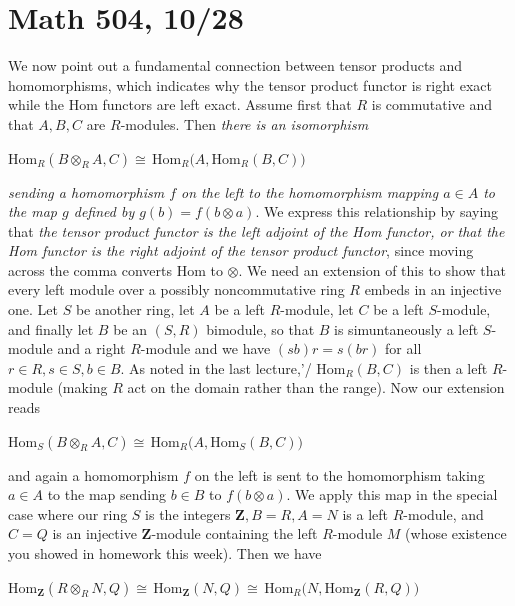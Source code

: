 \documentclass[10pt]{article}
\begin{document}
\section*{Math 504, 10/28}

We now point out a fundamental connection between tensor products and
homomorphisms, which indicates why the tensor product functor is right
exact while the Hom functors are left exact. Assume first that $R$ is
commutative and that $A,B,C$ are $R$-modules. Then {\sl there is an
  isomorphism}

Hom$_R(B\otimes_R A,C)\cong\,$Hom$_R(A,$Hom$_R(B,C))$

{\sl sending a homomorphism $f$ on the left to the homomorphism mapping
  $a\in A$ to the map $g$ defined by $g(b) = f(b\otimes a)$}. We express
this relationship by saying that {\sl the tensor product functor is the
  left adjoint of the Hom functor, or that the Hom functor is the right
  adjoint of the tensor product functor}, since moving across the comma
converts Hom to $\otimes$. We need an extension of this to show that
every left module over a possibly noncommutative ring $R$ embeds in an
injective one. Let $S$ be another ring, let $A$ be a left $R$-module,
let $C$ be a left $S$-module, and finally let $B$ be an $(S,R)$
bimodule, so that $B$ is simuntaneously a left $S$-module and a right
$R$-module and we have $(sb)r = s(br)$ for all $r\in R,s\in S,b\in B$.
As noted in the last lecture,'/ Hom$_R(B,C)$ is then a left $R$-module
(making $R$ act on the domain rather than the range). Now our extension
reads

Hom$_S(B\otimes_R A,C)\cong\,$Hom$_R(A,$Hom$_S(B,C))$

and again a homomorphism $f$ on the left is sent to the homomorphism
taking $a\in A$ to the map sending $b\in B$ to $f(b\otimes a)$. We apply
this map in the special case where our ring $S$ is the integers $\mathbf
Z, B=R, A=N$ is a left $R$-module, and $C=Q$ is an injective $\mathbf
Z$-module containing the left $R$-module $M$ (whose existence you showed
in homework this week). Then we have

Hom$_{\mathbf Z}(R\otimes_R N,Q) \cong\,$Hom$_{\mathbf
  Z}(N,Q)\cong\,$Hom$_R(N,$Hom$_{\mathbf Z} (R,Q))$
\end{document}
